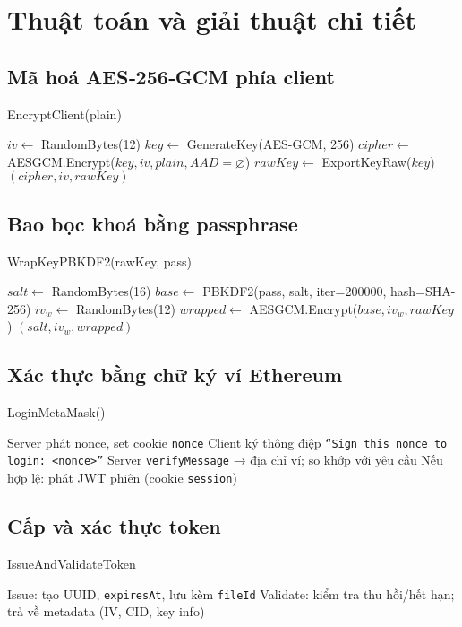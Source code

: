 \chapter{Thuật toán và giải thuật chi tiết}

\section{Mã hoá AES‑256‑GCM phía client}
\begin{algorithm}[H]
\caption{EncryptClient(plain)}
\begin{algorithmic}[1]
  \State $iv \gets$ RandomBytes(12)
  \State $key \gets$ GenerateKey(AES-GCM, 256)
  \State $cipher \gets$ AESGCM.Encrypt($key, iv, plain, AAD=\varnothing$)
  \State $rawKey \gets$ ExportKeyRaw($key$)
  \State \Return $(cipher, iv, rawKey)$
\end{algorithmic}
\end{algorithm}

\section{Bao bọc khoá bằng passphrase}
\begin{algorithm}[H]
\caption{WrapKeyPBKDF2(rawKey, pass)}
\begin{algorithmic}[1]
  \State $salt \gets$ RandomBytes(16)
  \State $base \gets$ PBKDF2(pass, salt, iter=200000, hash=SHA-256)
  \State $iv_w \gets$ RandomBytes(12)
  \State $wrapped \gets$ AESGCM.Encrypt($base, iv_w, rawKey$)
  \State \Return $(salt, iv_w, wrapped)$
\end{algorithmic}
\end{algorithm}

\section{Xác thực bằng chữ ký ví Ethereum}
\begin{algorithm}[H]
\caption{LoginMetaMask()}
\begin{algorithmic}[1]
  \State Server phát nonce, set cookie \texttt{nonce}
  \State Client ký thông điệp \texttt{``Sign this nonce to login: <nonce>''}
  \State Server \texttt{verifyMessage} → địa chỉ ví; so khớp với yêu cầu
  \State Nếu hợp lệ: phát JWT phiên (cookie \texttt{session})
\end{algorithmic}
\end{algorithm}

\section{Cấp và xác thực token}
\begin{algorithm}[H]
\caption{IssueAndValidateToken}
\begin{algorithmic}[1]
  \State Issue: tạo UUID, \texttt{expiresAt}, lưu kèm \texttt{fileId}
  \State Validate: kiểm tra thu hồi/hết hạn; trả về metadata (IV, CID, key info)
\end{algorithmic}
\end{algorithm}

